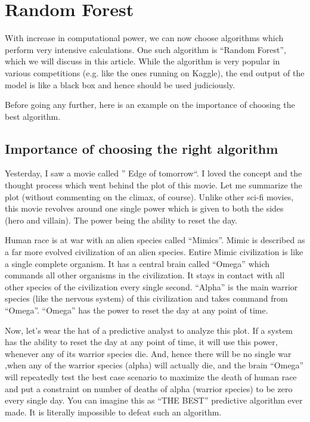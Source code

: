 

\pagestyle{fancy}
\setmarginsrb{20mm}{0mm}{20mm}{25mm}{12mm}{11mm}{0mm}{11mm}



\section*{Random Forest}
With increase in computational power, we can now choose algorithms which perform very intensive calculations. One such algorithm is “Random Forest”, which we will discuss in this article. While the algorithm is very popular in various competitions (e.g. like the ones running on Kaggle), the end output of the model is like a black box and hence should be used judiciously.

Before going any further, here is an example on the importance of choosing the best algorithm.



\subsection*{Importance of choosing the right algorithm}
Yesterday, I saw a movie called ” Edge of tomorrow“.  I loved the concept and the thought process which went behind the plot of this movie. Let me summarize the plot (without commenting on the climax, of course). Unlike other sci-fi movies, this movie revolves around one single power which is given to both the sides (hero and villain). The power being the ability to reset the day.

Human race is at war with an alien species called “Mimics”.  Mimic is described as a far more evolved civilization of an alien species. Entire Mimic civilization is like a single complete organism. It has a central brain called “Omega” which commands all other organisms in the civilization. It stays in contact with all other species of the civilization every single second. “Alpha” is the main warrior species (like the nervous system) of this civilization and takes command from “Omega”. “Omega” has the power to reset the day at any point of time.

Now, let’s wear the hat of a predictive analyst to analyze this plot. If a system has the ability to reset the day at any point of time, it will use this power, whenever any of its warrior species die. And, hence there will be no single war ,when any of the warrior species (alpha) will actually die, and the brain “Omega” will repeatedly test the best case scenario to maximize the death of human race and put a constraint on number of deaths of alpha (warrior species) to be zero every single day. You can imagine this as “THE BEST” predictive algorithm ever made. It is literally impossible to defeat such an algorithm.


